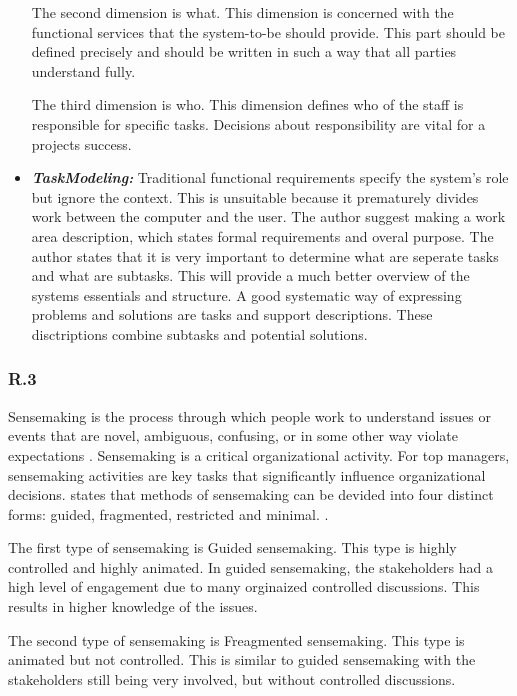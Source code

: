 \documentclass[]{article}
\begin{document}
\begin{itemize}
    The second dimension is what. 
    This dimension is concerned with the functional services that the system-to-be 
    should provide. This part should be defined precisely and should be written in 
    such a way that all parties understand fully.  

    The third dimension is who. 
    This dimension defines who of the staff is responsible for specific tasks. 
    Decisions about responsibility are vital for a projects success. 


    \item[] \textbf{\textit{TaskModeling: }}
    Traditional functional requirements specify the system's role but ignore the context. 
    This is unsuitable because it prematurely divides work between the computer and the user.
    The author suggest making a work area description, which states formal requirements 
    and overal purpose. The author states that it is very important to determine 
    what are seperate tasks and what are subtasks. This will provide a much better 
    overview of the systems essentials and structure. 
    A good systematic way of expressing problems and solutions are 
    tasks and support descriptions. These disctriptions combine subtasks and 
    potential solutions. 
\end{itemize} 

\subsubsection*{R.3}
Sensemaking is the process through which people work to understand issues or events that are novel, 
ambiguous, confusing, or in some other way violate expectations \cite{maitlis2014sensemaking}.
Sensemaking is a critical organizational activity. For top managers, sensemaking 
activities are key tasks that significantly influence organizational decisions\cite{maitlis2005social}.
\citeauthor{maitlis2005social} states that methods of sensemaking can be devided into four
distinct forms: guided, fragmented, restricted and minimal. \cite{maitlis2005social}. 

The first type of sensemaking is Guided sensemaking. 
This type is highly controlled and highly animated. 
In guided sensemaking, the stakeholders had a high level of engagement due to 
many orginaized controlled discussions.
This results in higher knowledge of the issues.

The second type of sensemaking is Freagmented sensemaking. 
This type is animated but not controlled. This is similar to guided 
sensemaking with the stakeholders still being very involved, 
but without controlled discussions.
\end{document}
